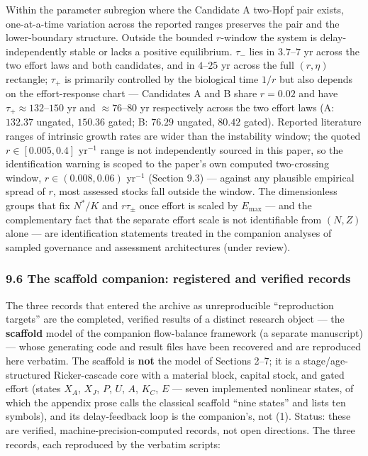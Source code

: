 \documentclass[11pt]{article}
\begin{document}
Within the parameter subregion where the Candidate A two-Hopf pair
exists, one-at-a-time variation across the reported ranges preserves the
pair and the lower-boundary structure. Outside the bounded \(r\)-window
the system is delay-independently stable or lacks a positive
equilibrium. \(\tau_-\) lies in \(3.7\)--\(7\) yr across the two effort
laws and both candidates, and in \(4\)--\(25\) yr across the full
\((r, \eta)\) rectangle; \(\tau_+\) is primarily controlled by the
biological time \(1/r\) but also depends on the effort-response chart
--- Candidates A and B share \(r = 0.02\) and have
\(\tau_+ \approx 132\)--\(150\) yr and \(\approx76\)--\(80\) yr
respectively across the two effort laws (A: \(132.37\) ungated,
\(150.36\) gated; B: \(76.29\) ungated, \(80.42\) gated). Reported
literature ranges of intrinsic growth rates are wider than the
instability window; the quoted \(r \in [0.005, 0.4]\) yr\(^{-1}\) range
is not independently sourced in this paper, so the identification
warning is scoped to the paper's own computed two-crossing window,
\(r \in (0.008, 0.06)\) yr\(^{-1}\) (Section 9.3) --- against any
plausible empirical spread of \(r\), most assessed stocks fall outside
the window. The dimensionless groups that fix \(N^*/K\) and
\(r\tau_\pm\) once effort is scaled by \(E_{\max}\) --- and the
complementary fact that the separate effort scale is not identifiable
from \((N, Z)\) alone --- are identification statements treated in the
companion analyses of sampled governance and assessment architectures
(under review).

\subsubsection{9.6 The scaffold companion: registered and verified
records}\label{the-scaffold-companion-registered-and-verified-records}

The three records that entered the archive as unreproducible
``reproduction targets'' are the completed, verified results of a
distinct research object --- the \textbf{scaffold} model of the
companion flow-balance framework (a separate manuscript) --- whose
generating code and result files have been recovered and are reproduced
here verbatim. The scaffold is \textbf{not} the model of Sections 2--7;
it is a stage/age-structured Ricker-cascade core with a material block,
capital stock, and gated effort (states \(X_A\), \(X_J\), \(P\), \(U\),
\(A\), \(K_C\), \(E\) --- seven implemented nonlinear states, of which
the appendix prose calls the classical scaffold ``nine states'' and
lists ten symbols), and its delay-feedback loop is the companion's, not
(1). Status: these are verified, machine-precision-computed records, not
open directions. The three records, each reproduced by the verbatim
scripts:
\end{document}

